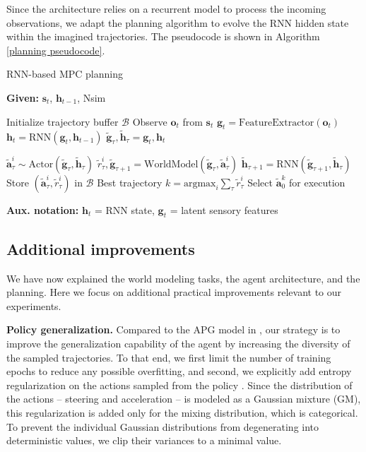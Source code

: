 Since the architecture relies on a recurrent model to process the incoming observations, we adapt the planning algorithm to evolve the RNN hidden state within the imagined trajectories. The pseudocode is shown in Algorithm \ref{planning pseudocode}.

\begin{algorithm}
\caption{RNN-based MPC planning}
\textbf{Given:} $\mathbf{s}_t$, $\mathbf{h}_{t-1}$, Nsim
\begin{algorithmic}[1]
\label{planning pseudocode}
\STATE Initialize trajectory buffer $\mathcal{B}$
\STATE Observe $\mathbf{o}_t$ from $\mathbf{s}_t$
\STATE $\mathbf{g}_t = \text{FeatureExtractor}(\mathbf{o}_t)$
\STATE $\mathbf{h}_t = \text{RNN}(\mathbf{g}_t, \mathbf{h}_{t-1})$
\STATE $\tilde{\mathbf{g}}_\tau, \tilde{\mathbf{h}}_{\tau} = \mathbf{g}_t, \mathbf{h}_t$

    \STATE $\tilde{\mathbf{a}}_\tau^i \sim \text{Actor}(\tilde{\mathbf{g}}_\tau, \tilde{\mathbf{h}}_{\tau})$
    \STATE $\tilde{r}_\tau^i, \tilde{\mathbf{g}}_{\tau+1} = \text{WorldModel}(\tilde{\mathbf{g}}_\tau, \tilde{\mathbf{a}}_{\tau}^i)$
    \STATE $\tilde{\mathbf{h}}_{\tau+1} = \text{RNN}(\tilde{\mathbf{g}}_{\tau+1}, \tilde{\mathbf{h}}_\tau)$
    \STATE Store $(\tilde{\mathbf{a}}_\tau^i, \tilde{r}_\tau^i)$ in $\mathcal{B}$
\ENDWHILE
\ENDFOR
\STATE Best trajectory $k = \text{argmax}_i \sum_{\tau} \tilde{r}_\tau^i$
\STATE Select $\tilde{\mathbf{a}}_0^k$ for execution 
\end{algorithmic}
\end{algorithm}
\captionsetup{justification=raggedright}
\vspace{-0.4cm}
\noindent
\textbf{Aux. notation:} $\mathbf{h}_t$ = RNN state, $\mathbf{g}_t$ = latent sensory features 

\subsection{Additional improvements}
\label{subsection: additional_improvements}

We have now explained the world modeling tasks, the agent architecture, and the planning. Here we focus on additional practical improvements relevant to our experiments.

\textbf{Policy generalization.} Compared to the APG model in \cite{nachkov2024autonomous}, our strategy is to improve the generalization capability of the agent by increasing the diversity of the sampled trajectories. To that end, we first limit the number of training epochs to reduce any possible overfitting, and second, we explicitly add entropy regularization on the actions sampled from the policy \cite{haarnoja2018soft}. Since the distribution of the actions -- steering and acceleration -- is modeled as a Gaussian mixture (GM), this regularization is added only for the mixing distribution, which is categorical. To prevent the individual Gaussian distributions from degenerating into deterministic values, we clip their variances to a minimal value.

